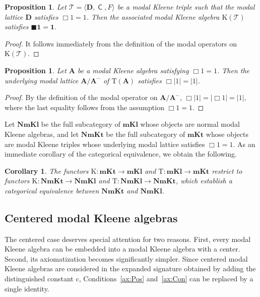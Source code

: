\documentclass[10pt,a4paper]{amsart}
\newtheorem{proposition}[theorem]{Proposition}
\newtheorem{corollary}[theorem]{Corollary}
\DeclareMathOperator{\con}{\mathsf{C}}
\newcommand{\cn}{\mathrm{c}}
\newcommand{\one}{\mathbf{1}}
\newcommand{\A}{\mathbf{A}}
\newcommand{\D}{\mathbf{D}}
\newcommand{\T}{\mathcal{T}}
\newcommand{\boxn}{\blacksquare}
\begin{document}
\begin{proposition}
Let $\T=\langle\D,\con,F\rangle$ be a modal Kleene triple such that the modal lattice $\D$ satisfies $\Box 1=1$. Then the associated modal Kleene algebra $\mathrm{K}(\T)$ satisfies $\boxn \one=\one$.
\end{proposition}
\begin{proof}
It follows immediately from the definition of the modal operators on $\mathrm{K}(\T)$. 
\end{proof}

\begin{proposition}
Let $\A$ be a modal Kleene algebra satisfying $\Box 1=1$. Then the underlying modal lattice $\mathbf{A/A^{-}}$ of $\mathrm{T}(\A)$ satisfies $\Box |1|=|1|$.
\end{proposition}
\begin{proof}
By the definition of the modal operator on $\mathbf{A/A^{-}}$, $\Box|1|=|\Box1|=|1|$,
where the last equality follows from the assumption $\Box1=1$.
\end{proof}

Let $\mathbf{NmKl}$ be the full subcategory of $\mathbf{mKl}$ whose objects are normal modal Kleene algebras, and let $\mathbf{NmKt}$ be the full subcategory of $\mathbf{mKt}$ whose objects are modal Kleene triples whose underlying modal lattice satisfies $\Box1=1$. As an immediate corollary of the categorical equivalence, we obtain the following.

\begin{corollary}
The functors $\mathrm{K}:\mathbf{mKt}\to\mathbf{mKl}$ and $\mathrm{T}:\mathbf{mKl}\to\mathbf{mKt}$ restrict to functors $\mathrm{K}:\mathbf{NmKt}\to\mathbf{NmKl}$ and $\mathrm{T}:\mathbf{NmKl}\to\mathbf{NmKt}$, which establish a categorical equivalence between $\mathbf{NmKt}$ and $\mathbf{NmKl}$.
\end{corollary}

 \subsection{Centered modal Kleene algebras}\label{subsec:centered}

The centered case deserves special attention for two reasons. First, every modal Kleene algebra can be embedded into a modal Kleene algebra with a center. Second, its axiomatization becomes significantly simpler. Since centered modal Kleene algebras are considered in the expanded signature obtained by adding the distinguished constant $\cn$, Conditions~\eqref{ax:Pos} and~\eqref{ax:Con} can be replaced by a single identity.
\end{document}
